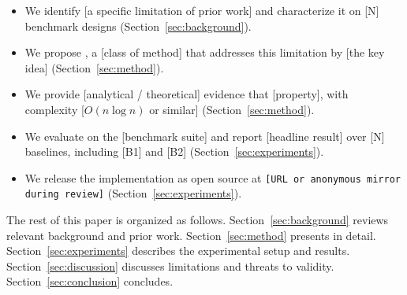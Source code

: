 \begin{itemize}
    \item We identify [a specific limitation of prior work] and characterize
          it on [N] benchmark designs (Section~\ref{sec:background}).
    \item We propose \method{}, a [class of method] that addresses this
          limitation by [the key idea] (Section~\ref{sec:method}).
    \item We provide [analytical / theoretical] evidence that \method{}
          [property], with complexity [\(O(n \log n)\) or similar]
          (Section~\ref{sec:method}).
    \item We evaluate \method{} on the [benchmark suite] and report
          [headline result] over [N] baselines, including [B1] and [B2]
          (Section~\ref{sec:experiments}).
    \item We release the implementation as open source at
          \texttt{[URL or anonymous mirror during review]}
          (Section~\ref{sec:experiments}).
\end{itemize}

The rest of this paper is organized as follows.
Section~\ref{sec:background} reviews relevant background and prior work.
Section~\ref{sec:method} presents \method{} in detail.
Section~\ref{sec:experiments} describes the experimental setup and
results. Section~\ref{sec:discussion} discusses limitations and threats
to validity. Section~\ref{sec:conclusion} concludes.
